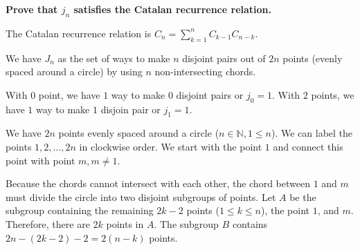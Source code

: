 \documentclass[10pt]{article}
\begin{document}
\begin{enumerate}
\begin{enumerate}
\begin{center}
\end{center}

\textbf{Prove that $j_n$ satisfies the Catalan recurrence relation.}

The Catalan recurrence relation is $C_n= \sum\limits^{n}_{k=1}C_{k-1}C_{n-k}$.

We have $J_n$ as the set of ways to make $n$ disjoint pairs out of $2n$ points (evenly spaced around a circle) by using $n$ non-intersecting chords.

With $0$ point, we have $1$ way to make $0$ disjoint pairs or $j_0 = 1$. With $2$ points, we have $1$ way to make $1$ disjoin pair or $j_1=1$.

We have $2n$ points evenly spaced around a circle ($n \in \mathbb{N}, 1 \leq n$). We can label the points $1,2, \ldots,2n$ in clockwise order. We start with the point $1$ and connect this point with point $m, m\neq 1$. 
\begin{center}
\quad\quad
\end{center}

Because the chords cannot intersect with each other, the chord between $1$ and $m$ must divide the circle into two disjoint subgroups of points. Let $A$ be the subgroup containing the remaining $2k-2$ points ($1 \leq k \leq n$), the point $1$, and $m$. Therefore, there are $2k$ points in $A$. The subgroup $B$ contains $2n - (2k-2) - 2 = 2(n-k)$ points. 

\begin{center}
\begin{tikzpicture}[scale=.25]


\end{tikzpicture}
\end{center}
\end{enumerate}
\end{enumerate}
\end{document}
